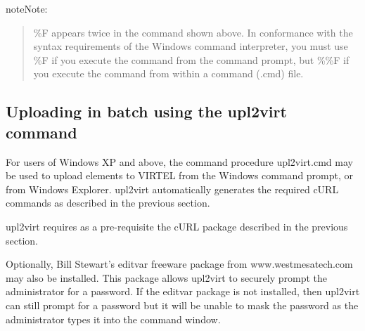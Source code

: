 \documentclass[letterpaper,10pt,english]{sphinxmanual}
\begin{document}
\begin{sphinxadmonition}{note}{Note:}\begin{quote}

\%F appears twice in the command shown above. In conformance with the syntax requirements of the Windows command interpreter, you must use \%F if you execute the command from the command prompt, but \%\%F if you execute the command from within a command (.cmd) file.
\end{quote}

\ignorespaces \end{sphinxadmonition}

\ignorespaces 

\subsection{Uploading in batch using the upl2virt command}
\label{\detokenize{audit_operations_ and_performance:uploading-in-batch-using-the-upl2virt-command}}\label{\detokenize{audit_operations_ and_performance:index-66}}
For users of Windows XP and above, the command procedure upl2virt.cmd may be used to upload elements to VIRTEL from the Windows command prompt, or from Windows Explorer. upl2virt automatically generates the required cURL commands as described in the previous section.


upl2virt requires as a pre-requisite the cURL package described in the previous section.

Optionally, Bill Stewart’s editvar freeware package from www.westmesatech.com may also be installed. This package allows upl2virt to securely prompt the administrator for a password. If the editvar package is not installed, then upl2virt can still prompt for a password but it will be unable to mask the password as the administrator types it into
the command window.
\end{document}
